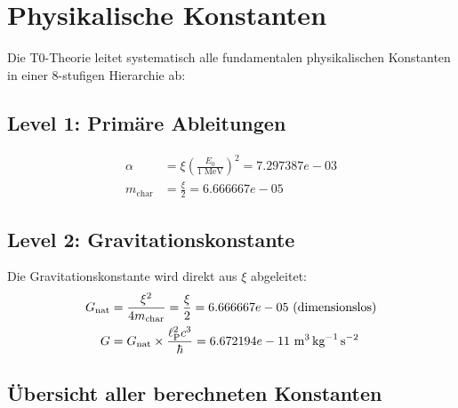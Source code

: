 \documentclass[11pt,a4paper]{article}
\begin{document}
\section{Physikalische Konstanten}

Die T0-Theorie leitet systematisch alle fundamentalen physikalischen Konstanten in einer 8-stufigen Hierarchie ab:

\subsection{Level 1: Primäre Ableitungen}
\begin{align}
\alpha &= \xi \left(\frac{E_0}{1 \text{ MeV}}\right)^2 = 7.297387e-03 \\
m_{\text{char}} &= \frac{\xi}{2} = 6.666667e-05
\end{align}

\subsection{Level 2: Gravitationskonstante}

Die Gravitationskonstante wird direkt aus $\xi$ abgeleitet:
\begin{align}
G_{\text{nat}} &= \frac{\xi^2}{4 m_{\text{char}}} = \frac{\xi}{2} = 6.666667e-05 \text{ (dimensionslos)} \\
G &= G_{\text{nat}} \times \frac{\ell_\text{P}^2 c^3}{\hbar} = 6.672194e-11 \text{ \si{\cubic\meter\per\kilogram\per\second\squared}}
\end{align}

\subsection{Übersicht aller berechneten Konstanten}
\end{document}

